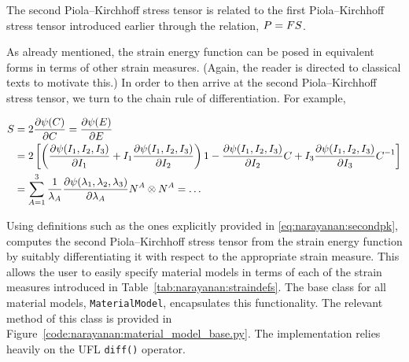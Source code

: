\noindent The second Piola--Kirchhoff stress tensor is related to the
first Piola--Kirchhoff stress tensor introduced earlier through the
relation, $\mbox{$ P$} = \mbox{$ F$} \mbox{$ S$}$.

As already mentioned, the strain energy function can be posed in
equivalent forms in terms of other strain measures. (Again, the reader
is directed to classical texts to motivate this.) In order to then
arrive at the second Piola--Kirchhoff stress tensor, we turn to the
chain rule of differentiation. For example,

\begin{equation}
\begin{split}
  \mbox{$ S$} & = 2 \frac{\partial \psi(\mbox{$ C$})}{\partial \mbox{$ C$}} = \frac{\partial
    \psi(\mbox{$ E$})}{\partial \mbox{$ E$}}\\
      & = 2\left[\left(\frac{\partial \psi (I_{1}, I_{2},
            I_{3})}{\partial I_{1}} + I_{1} \frac{\partial \psi (I_{1}, I_{2},
            I_{3})}{\partial I_{2}} \right) {1} - \frac{\partial \psi (I_{1},
          I_{2}, I_{3})}{\partial I_{2}} \mbox{$ C$} + I_{3} \frac{\partial \psi (I_{1},
          I_{2}, I_{3})}{\partial I_{3}} \mbox{$ C$}^{-1} \right]\\
      & = \sum_{A = 1}^{3}
      \frac{1}{\lambda_{A}} \frac{\partial \psi(\lambda_{1},
        \lambda_{2}, \lambda_{3})}{\partial
        \lambda_{A}} \mbox{$ N$}^{A}\otimes\mbox{$ N$}^{A} = \ldots
\end{split}
\label{eq:narayanan:secondpk}
\end{equation}

Using definitions such as the ones explicitly provided in
\eqref{eq:narayanan:secondpk}, \twist{} computes the second
Piola--Kirchhoff stress tensor from the strain energy function by
suitably differentiating it with respect to the appropriate strain
measure. This allows the user to easily specify material models in
terms of each of the strain measures introduced in
Table~\ref{tab:narayanan:straindefs}. The base class for all material
models, {\tt MaterialModel}, encapsulates this functionality. The
relevant method of this class is provided in
Figure~\ref{code:narayanan:material_model_base.py}. The implementation
relies heavily on the UFL {\tt diff()} operator.

